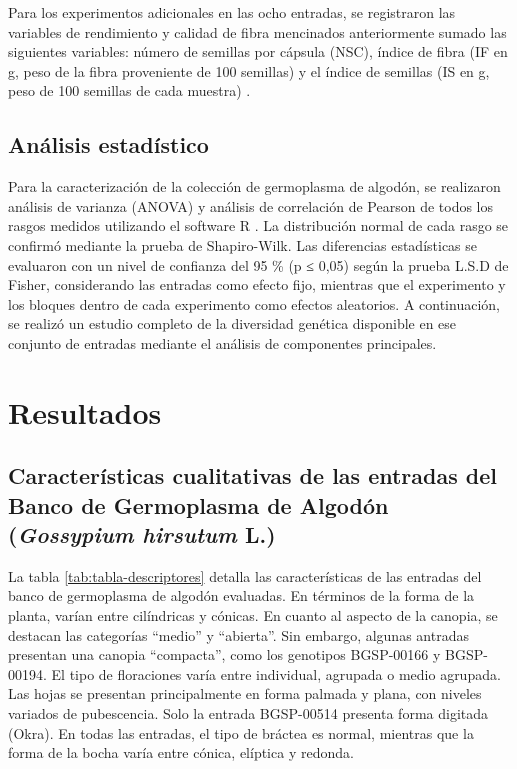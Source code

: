 \documentclass[12pt,oneside]{reedthesis}
\begin{document}
Para los experimentos adicionales en las ocho entradas, se registraron las variables de rendimiento y calidad de fibra mencinados anteriormente sumado las siguientes variables: número de semillas por cápsula (NSC)\autocite{worley1974}, índice de fibra (IF en g, peso de la fibra proveniente de 100 semillas) y el índice de semillas (IS en g, peso de 100 semillas de cada muestra) \autocite{pettigrew2013}.

\subsection{Análisis estadístico}\label{anuxe1lisis-estaduxedstico}

Para la caracterización de la colección de germoplasma de algodón, se realizaron análisis de varianza (ANOVA) y análisis de correlación de Pearson de todos los rasgos medidos utilizando el software R \autocite{R2024}. La distribución normal de cada rasgo se confirmó mediante la prueba de Shapiro-Wilk. Las diferencias estadísticas se evaluaron con un nivel de confianza del 95 \% (p ≤ 0,05) según la prueba L.S.D de Fisher, considerando las entradas como efecto fijo, mientras que el experimento y los bloques dentro de cada experimento como efectos aleatorios. A continuación, se realizó un estudio completo de la diversidad genética disponible en ese conjunto de entradas mediante el análisis de componentes principales.

\section{Resultados}\label{resultados}

\subsection{\texorpdfstring{Características cualitativas de las entradas del Banco de Germoplasma de Algodón (\emph{Gossypium hirsutum} L.)}{Características cualitativas de las entradas del Banco de Germoplasma de Algodón (Gossypium hirsutum L.)}}\label{caracteruxedsticas-cualitativas-de-las-entradas-del-banco-de-germoplasma-de-algoduxf3n-gossypium-hirsutum-l.}

La tabla \ref{tab:tabla-descriptores} detalla las características de las entradas del banco de germoplasma de algodón evaluadas. En términos de la forma de la planta, varían entre cilíndricas y cónicas. En cuanto al aspecto de la canopia, se destacan las categorías ``medio'' y ``abierta''. Sin embargo, algunas antradas presentan una canopia ``compacta'', como los genotipos BGSP-00166 y BGSP-00194. El tipo de floraciones varía entre individual, agrupada o medio agrupada. Las hojas se presentan principalmente en forma palmada y plana, con niveles variados de pubescencia. Solo la entrada BGSP-00514 presenta forma digitada (Okra). En todas las entradas, el tipo de bráctea es normal, mientras que la forma de la bocha varía entre cónica, elíptica y redonda.
\end{document}
